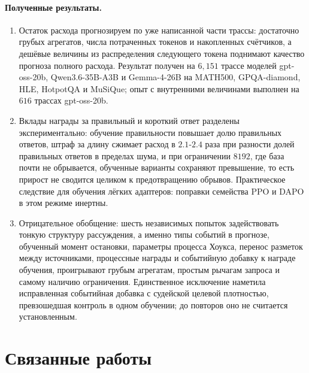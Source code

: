 \documentclass[11pt]{article}
\begin{document}
\paragraph{Полученные результаты.}
\begin{enumerate}
\item Остаток расхода прогнозируем по уже написанной части трассы: достаточно грубых агрегатов, числа потраченных токенов и накопленных счётчиков, а дешёвые величины из распределения следующего токена поднимают качество прогноза полного расхода. Результат получен на $6{,}151$ трассе моделей gpt-oss-20b, Qwen3.6-35B-A3B и Gemma-4-26B на MATH500, GPQA-diamond, HLE, HotpotQA и MuSiQue; опыт с внутренними величинами выполнен на $616$ трассах gpt-oss-20b.
\item Вклады награды за правильный и короткий ответ разделены экспериментально: обучение правильности повышает долю правильных ответов, штраф за длину сжимает расход в $2.1$-$2.4$ раза при разности долей правильных ответов в пределах шума, и при ограничении $8192$, где база почти не обрывается, обученные варианты сохраняют превышение, то есть прирост не сводится целиком к предотвращению обрывов. Практическое следствие для обучения лёгких адаптеров: поправки семейства PPO и DAPO в этом режиме инертны.
\item Отрицательное обобщение: шесть независимых попыток задействовать тонкую структуру рассуждения, а именно типы событий в прогнозе, обученный момент остановки, параметры процесса Хоукса, перенос разметок между источниками, процессные награды и событийную добавку к награде обучения, проигрывают грубым агрегатам, простым рычагам запроса и самому наличию ограничения. Единственное исключение наметила исправленная событийная добавка с судейской целевой плотностью, превзошедшая контроль в одном обучении; до повторов оно не считается установленным.
\end{enumerate}

\section{Связанные работы}
\end{document}
